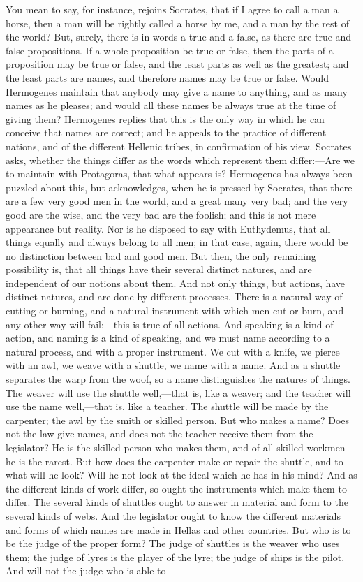 \documentclass[11pt,letter]{article}
\begin{document}
\par  You mean to say, for instance, rejoins Socrates, that if I agree to call a man a horse, then a man will be rightly called a horse by me, and a man by the rest of the world? But, surely, there is in words a true and a false, as there are true and false propositions. If a whole proposition be true or false, then the parts of a proposition may be true or false, and the least parts as well as the greatest; and the least parts are names, and therefore names may be true or false. Would Hermogenes maintain that anybody may give a name to anything, and as many names as he pleases; and would all these names be always true at the time of giving them? Hermogenes replies that this is the only way in which he can conceive that names are correct; and he appeals to the practice of different nations, and of the different Hellenic tribes, in confirmation of his view. Socrates asks, whether the things differ as the words which represent them differ:—Are we to maintain with Protagoras, that what appears is? Hermogenes has always been puzzled about this, but acknowledges, when he is pressed by Socrates, that there are a few very good men in the world, and a great many very bad; and the very good are the wise, and the very bad are the foolish; and this is not mere appearance but reality. Nor is he disposed to say with Euthydemus, that all things equally and always belong to all men; in that case, again, there would be no distinction between bad and good men. But then, the only remaining possibility is, that all things have their several distinct natures, and are independent of our notions about them. And not only things, but actions, have distinct natures, and are done by different processes. There is a natural way of cutting or burning, and a natural instrument with which men cut or burn, and any other way will fail;—this is true of all actions. And speaking is a kind of action, and naming is a kind of speaking, and we must name according to a natural process, and with a proper instrument. We cut with a knife, we pierce with an awl, we weave with a shuttle, we name with a name. And as a shuttle separates the warp from the woof, so a name distinguishes the natures of things. The weaver will use the shuttle well,—that is, like a weaver; and the teacher will use the name well,—that is, like a teacher. The shuttle will be made by the carpenter; the awl by the smith or skilled person. But who makes a name? Does not the law give names, and does not the teacher receive them from the legislator? He is the skilled person who makes them, and of all skilled workmen he is the rarest. But how does the carpenter make or repair the shuttle, and to what will he look? Will he not look at the ideal which he has in his mind? And as the different kinds of work differ, so ought the instruments which make them to differ. The several kinds of shuttles ought to answer in material and form to the several kinds of webs. And the legislator ought to know the different materials and forms of which names are made in Hellas and other countries. But who is to be the judge of the proper form? The judge of shuttles is the weaver who uses them; the judge of lyres is the player of the lyre; the judge of ships is the pilot. And will not the judge who is able to 
\end{document}
